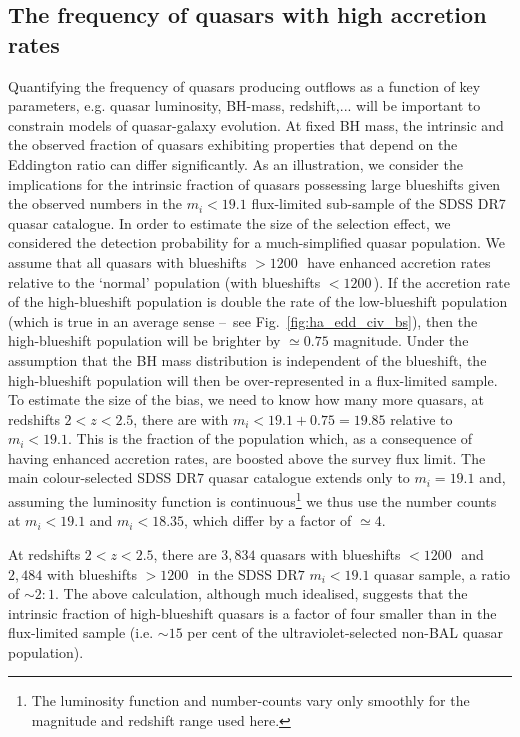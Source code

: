 \subsection{The frequency of quasars with high accretion rates}

Quantifying the frequency of quasars producing outflows as a function of key parameters, e.g. quasar luminosity, BH-mass, redshift,... will be important to constrain models of quasar-galaxy evolution.  
At fixed BH mass, the intrinsic and the observed fraction of quasars exhibiting properties that depend on the Eddington ratio can differ significantly. 
As an illustration, we consider the implications for the intrinsic fraction of quasars possessing large  blueshifts given the observed numbers in the $m_i<19.1$ flux-limited sub-sample of the SDSS DR7 quasar catalogue. 
In order to estimate the size of the selection effect, we considered the detection probability for a much-simplified quasar population. 
We assume that all quasars with  blueshifts $>1200$\,\kms\, have enhanced accretion rates relative to the `normal' population (with  blueshifts $<1200$\,\kms). 
If the accretion rate of the high-blueshift population is double the rate of the low-blueshift population (which is true in an average sense \---\ see Fig.~\ref{fig:ha_edd_civ_bs}), then the high-blueshift population will be brighter by $\simeq0.75$ magnitude.
Under the assumption that the BH mass distribution is independent of the  blueshift, the high-blueshift population will then be over-represented in a flux-limited sample.
To estimate the size of the bias, we need to know how many more quasars, at redshifts $2 < z < 2.5$, there are with $m_i<19.1+0.75=19.85$ relative to $m_i < 19.1$.
This is the fraction of the population which, as a consequence of having enhanced accretion rates, are boosted above the survey flux limit.    
The main colour-selected SDSS DR$7$ quasar catalogue extends only to $m_i= 19.1$ and, assuming the luminosity function is continuous\footnote{The luminosity function and number-counts vary only smoothly \citep[e.g.][]{ross13} for the magnitude and redshift range used here.} we thus use the number counts at $m_i < 19.1$ and $m_i < 18.35$, which differ by a factor of $\simeq 4$. 

At redshifts $2 < z <2.5$, there are $3,834$ quasars with  blueshifts $<1200$\,\kms\, and $2,484$ with blueshifts $>1200$\,\kms\, in the SDSS DR$7$ $m_i < 19.1$ quasar sample, a ratio of $\sim2:1$. 
The above calculation, although much idealised, suggests that the intrinsic fraction of high-blueshift quasars is a factor of four smaller than in the flux-limited sample (i.e. $\sim15$ per cent of the ultraviolet-selected non-BAL quasar population). 

